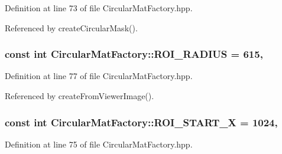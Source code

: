 Definition at line 73 of file Circular\-Mat\-Factory.\-hpp.



Referenced by create\-Circular\-Mask().

\hypertarget{classmultiscale_1_1analysis_1_1CircularMatFactory_af26e9372a9bfb4428e9bdef952afedff}{
\subsubsection[{R\-O\-I\-\_\-\-R\-A\-D\-I\-U\-S}]{\setlength{\rightskip}{0pt plus 5cm}const int Circular\-Mat\-Factory\-::\-R\-O\-I\-\_\-\-R\-A\-D\-I\-U\-S = 615\hspace{0.3cm}{\ttfamily [static]}, {\ttfamily [private]}}}\label{classmultiscale_1_1analysis_1_1CircularMatFactory_af26e9372a9bfb4428e9bdef952afedff}


Definition at line 77 of file Circular\-Mat\-Factory.\-hpp.



Referenced by create\-From\-Viewer\-Image().

\hypertarget{classmultiscale_1_1analysis_1_1CircularMatFactory_a0e2da07df4736b0ec21567721ae94af5}{
\subsubsection[{R\-O\-I\-\_\-\-S\-T\-A\-R\-T\-\_\-\-X}]{\setlength{\rightskip}{0pt plus 5cm}const int Circular\-Mat\-Factory\-::\-R\-O\-I\-\_\-\-S\-T\-A\-R\-T\-\_\-\-X = 1024\hspace{0.3cm}{\ttfamily [static]}, {\ttfamily [private]}}}\label{classmultiscale_1_1analysis_1_1CircularMatFactory_a0e2da07df4736b0ec21567721ae94af5}


Definition at line 75 of file Circular\-Mat\-Factory.\-hpp.



